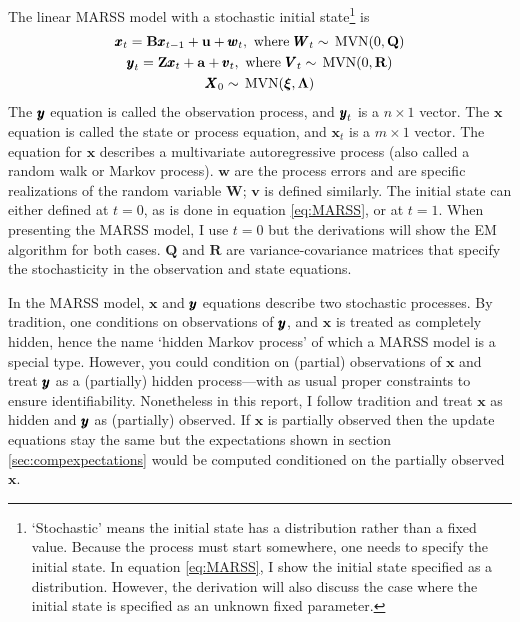 \documentclass[]{article}
\def\xixi{\mbox{\boldmath $\xi$}}
\def\LAM{\mbox{\boldmath $\Lambda$}}
\def\ZZ{\mbox{$\mathbf Z$}}	\def\zz{\mbox{$\mathbf z$}}
\def\BB{\mbox{$\mathbf B$}}	\def\bb{\mbox{$\mathbf b$}}
\def\QQ{\mbox{$\mathbf Q$}}	 \def\qq{\mbox{$\mathbf q$}}
\def\RR{\mbox{$\mathbf R$}}	 \def\rr{\mbox{$\mathbf r$}}
\def\VV{\mbox{$\pmb{V}$}}	\def\vv{\mbox{$\pmb{v}$}}
\def\WW{\mbox{$\pmb{W}$}}	\def\ww{\mbox{$\pmb{w}$}}
\def\XX{\mbox{$\pmb{X}$}}	\def\xx{\mbox{$\pmb{x}$}}
\def\MVN{\,\textup{\textrm{MVN}}}
\begin{document}
The linear MARSS model with a stochastic initial state\footnote{`Stochastic' means the initial state has a distribution rather than a fixed value. Because the process must start somewhere, one needs to specify the initial state. In equation \ref{eq:MARSS}, I show the initial state specified as a distribution.  However, the derivation will also discuss the case where the initial state is specified as an unknown fixed parameter.} is
\begin{subequations}\label{eq:MARSS}
\begin{gather}
\xx_t = \BB\xx_{t-1} + \uu + \ww_t, \text{ where } \WW_t \sim \MVN(0,\QQ) \label{eq:MARSSx}\\
\yy_t = \ZZ\xx_t + \aa + \vv_t, \text{ where } \VV_t \sim \MVN(0,\RR) \label{eq:MARSSy}\\
\XX_0 \sim \MVN(\xixi,\LAM) \label{eq:MARSSx1}
\end{gather}
\end{subequations}
The $\mbox{$\pmb{y}$}$ equation is called the observation process, and $\mbox{$\pmb{y}$}_t$ is a $n \times 1$ vector.  The $\xx$ equation is called the state or process equation, and $\xx_t$ is a $m \times 1$ vector. The equation for $\xx$ describes a multivariate autoregressive process (also called a random walk or Markov process). $\ww$ are the process errors and are specific realizations of the random variable $\WW$; $\vv$ is defined similarly.  The initial state can either defined at $t=0$, as is done in equation \ref{eq:MARSS}, or at $t=1$.  When presenting the MARSS model, I use $t=0$ but the derivations will show the EM algorithm for both cases. $\QQ$ and $\RR$ are variance-covariance matrices that specify the stochasticity in the observation and state equations.  

In the MARSS model, $\xx$ and $\mbox{$\pmb{y}$}$ equations describe two stochastic processes.  By tradition, one conditions on observations of $\mbox{$\pmb{y}$}$, and $\xx$ is treated as completely hidden, hence the name `hidden Markov process' of which a MARSS model is a special type.  However, you could condition on (partial) observations of $\xx$ and treat $\mbox{$\pmb{y}$}$ as a (partially) hidden process---with as usual proper constraints to ensure identifiability.  Nonetheless in this report, I follow tradition and treat $\xx$ as hidden and $\mbox{$\pmb{y}$}$ as (partially) observed.  If $\xx$ is partially observed then the update equations stay the same but the expectations shown in section \ref{sec:compexpectations} would be computed conditioned on the partially observed $\xx$.
\end{document}
